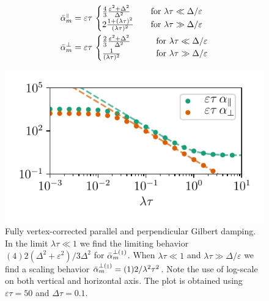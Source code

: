 \begin{align}
\label{eq:alphapara}
    \bar{\alpha}_m^{{\scriptscriptstyle\parallel}} &= 
    {\varepsilon\tau}\,  \begin{cases}
        \frac{4}{3}\frac{\varepsilon^2+\Delta^2}{\Delta^2}
            &\quad \text{for } \lambda\tau        \ll \Delta/\varepsilon\\
        2\frac{1+(\lambda\tau)^2}{(\lambda\tau)^2}
            &\quad \text{for } \lambda\tau \gg \Delta/\varepsilon 
    \end{cases}\\
    \label{eq:alphaperp}
    \bar{\alpha}_m^{\perp} &= {\varepsilon\tau}\,
    \begin{cases}
        \frac{2}{3}\frac{\varepsilon^2+\Delta^2}{\Delta^2}
            \quad\quad &\text{for } \lambda\tau        \ll \Delta/\varepsilon\\
        \frac{1}{(\lambda\tau)^2}
            \quad &\text{for } \lambda\tau \gg \Delta/\varepsilon 
    \end{cases}
\end{align}
\begin{figure}
    \centering
    \includegraphics[width=0.75\linewidth]{gfx/alpha_full}
    \caption{Fully vertex-corrected parallel and perpendicular Gilbert damping. In the limit $\lambda\tau\ll1$ we find the limiting behavior $(4)2(\Delta^2+\varepsilon^2)/3\Delta^2$ for $\bar{\alpha}_m^{\perp({\scriptscriptstyle\parallel})}$. When $\lambda\tau\ll 1$ and $\lambda\tau\gg\Delta/\varepsilon$ we find a scaling behavior $\bar{\alpha}_m^{\perp({\scriptscriptstyle\parallel})}=(1)2/\lambda^2\tau^2$. Note the use of log-scale on both vertical and horizontal axis. The plot is obtained using $\varepsilon\tau=50$ and $\Delta\tau=0.1$. }
    \label{fig:alpha_plot}
\end{figure}



